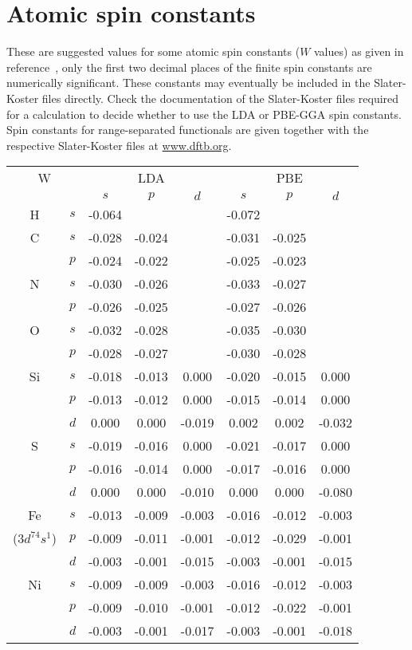 
\chapter{Atomic spin constants}
\label{app:spinconst}

These are suggested values for some atomic spin constants ($W$ values)
as given in reference~\cite{KoehlerThesis}, only the first two decimal
places of the finite spin constants are numerically significant. These
constants may eventually be included in the Slater-Koster files
directly. Check the documentation of the Slater-Koster files required
for a calculation to decide whether to use the LDA or PBE-GGA spin
constants. Spin constants for range-separated functionals are given
together with the respective Slater-Koster files at \url{www.dftb.org}. 

\begin{center}
\begin{tabular}{|cc|ccc|ccc|} \hline
\multicolumn{2}{|c|}{W}
   & \multicolumn{3}{c|}{LDA}   & \multicolumn{3}{c|}{PBE} \\ \cline{3-8}
   &     & $s$ & $p$ & $d$       &  $s$ & $p$ & $d$ \\ \hline
H  & $s$ & -0.064 &        &        & -0.072 &        & \\\hline  
C  & $s$ & -0.028 & -0.024 &        & -0.031 & -0.025 & \\  
   & $p$ & -0.024 & -0.022 &        & -0.025 & -0.023 & \\\hline  
N  & $s$ & -0.030 & -0.026 &        & -0.033 & -0.027 & \\  
   & $p$ & -0.026 & -0.025 &        & -0.027 & -0.026 & \\\hline  
O  & $s$ & -0.032 & -0.028 &        & -0.035 & -0.030 & \\  
   & $p$ & -0.028 & -0.027 &        & -0.030 & -0.028 & \\\hline 
Si & $s$ & -0.018 & -0.013 &  0.000 & -0.020 & -0.015 &  0.000\\
   & $p$ & -0.013 & -0.012 &  0.000 & -0.015 & -0.014 &  0.000\\
   & $d$ &  0.000 &  0.000 & -0.019 &  0.002 &  0.002 & -0.032\\\hline
S  & $s$ & -0.019 & -0.016 &  0.000 & -0.021 & -0.017 &  0.000\\
   & $p$ & -0.016 & -0.014 &  0.000 & -0.017 & -0.016 &  0.000\\
   & $d$ &  0.000 &  0.000 & -0.010 &  0.000 &  0.000 & -0.080\\\hline
Fe & $s$ & -0.013 & -0.009 & -0.003 & -0.016 & -0.012 & -0.003\\
($3d^74s^1$)
   & $p$ & -0.009 & -0.011 & -0.001 & -0.012 & -0.029 & -0.001\\
   & $d$ & -0.003 & -0.001 & -0.015 & -0.003 & -0.001 & -0.015\\\hline
Ni & $s$ & -0.009 & -0.009 & -0.003 & -0.016 & -0.012 & -0.003\\
   & $p$ & -0.009 & -0.010 & -0.001 & -0.012 & -0.022 & -0.001\\
   & $d$ & -0.003 & -0.001 & -0.017 & -0.003 & -0.001 & -0.018\\\hline
\end{tabular}
\end{center}
